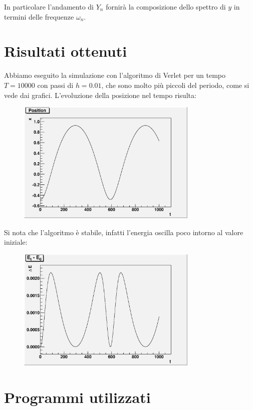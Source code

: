 \documentclass[italian,a4paper]{article}
\newcommand{\w}{\omega}
\begin{document}
In particolare l'andamento di $Y_n$ fornir\`a la composizione dello spettro di $y$ in termini delle frequenze $\w_n$.

\section{Risultati ottenuti}

Abbiamo eseguito la simulazione con l'algoritmo di Verlet per un tempo $T =
10000$ con passi di $h = 0.01$, che sono molto più piccoli del periodo, come
si vede dai grafici. L'evoluzione della posizione nel tempo risulta:
 \begin{figure}[h!]
 \begin{center}
 \includegraphics[width=0.77\textwidth]{position_graph.eps}
 \caption{
 }
 \label{}
 \end{center}
 \end{figure}

 Si nota che l'algoritmo è stabile, infatti l'energia oscilla poco intorno
 al valore iniziale:
 \begin{figure}[h!]
 \begin{center}
 \includegraphics[width=0.77\textwidth]{delta_energy_graph.eps}
 \caption{
 }
 \label{}
 \end{center}
 \end{figure}

\clearpage
\section{Programmi utilizzati}

% 
\end{document}
